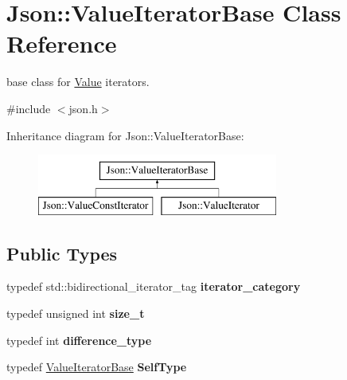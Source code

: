 \hypertarget{class_json_1_1_value_iterator_base}{}\section{Json\+:\+:Value\+Iterator\+Base Class Reference}
\label{class_json_1_1_value_iterator_base}


base class for \hyperlink{class_json_1_1_value}{Value} iterators.  




{\ttfamily \#include $<$json.\+h$>$}

Inheritance diagram for Json\+:\+:Value\+Iterator\+Base\+:\begin{figure}[H]
\begin{center}
\leavevmode
\includegraphics[height=2.000000cm]{class_json_1_1_value_iterator_base}
\end{center}
\end{figure}
\subsection*{Public Types}
\begin{DoxyCompactItemize}
\item 
\mbox{\label{class_json_1_1_value_iterator_base_a02fd11a4fbdc0007da1e8bcf5e6b83c3}} 
typedef std\+::bidirectional\+\_\+iterator\+\_\+tag {\bfseries iterator\+\_\+category}
\item 
\mbox{\label{class_json_1_1_value_iterator_base_a9d3a3c7ce5cdefe23cb486239cf07bb5}} 
typedef unsigned int {\bfseries size\+\_\+t}
\item 
\mbox{\label{class_json_1_1_value_iterator_base_a4e44bf8cbd17ec8d6e2c185904a15ebd}} 
typedef int {\bfseries difference\+\_\+type}
\item 
\mbox{\label{class_json_1_1_value_iterator_base_a9d2a940d03ea06d20d972f41a89149ee}} 
typedef \hyperlink{class_json_1_1_value_iterator_base}{Value\+Iterator\+Base} {\bfseries Self\+Type}
\end{DoxyCompactItemize}

